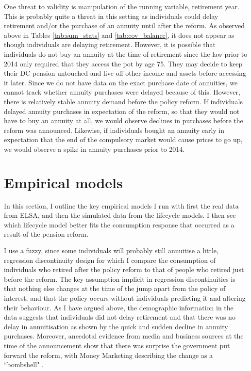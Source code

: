 \documentclass[12pt]{article}
\begin{document}
One threat to validity is manipulation of the running variable, retirement year.
This is probably quite a threat in this setting as individuals could delay
retirement and/or the purchase of an annuity until after the reform. As observed
above in Tables \ref{tab:sum_stats} and \ref{tab:cov_balance}, it does not
appear as though individuals are delaying retirement. However, it is possible
that individuals do not buy an annuity at the time of retirement since the law
prior to 2014 only required that they access the pot by age 75. They may decide
to keep their DC pension untouched and live off other income and assets before
accessing it later. Since we do not have data on the exact purchase date of
annuities, we cannot track whether annuity purchases were delayed because of
this. However, there is relatively stable annuity demand before the policy
reform. If individuals delayed annuity purchases in expectation of the reform,
so that they would not have to buy an annuity at all, we would observe declines
in purchases before the reform was announced. Likewise, if individuals bought an
annuity early in expectation that the end of the compulsory market would cause
prices to go up, we would observe a spike in annuity purchases prior to 2014.


\section{Empirical models}

In this section, I outline the key empirical models I run with first the real
data from ELSA, and then the simulated data from the lifecycle models. I then
see which lifecycle model better fits the consumption response that occurred as
a result of the pension reform.

I use a fuzzy, since some individuals will probably still annuitise a little,
regression discontinuity design for which I compare the consumption of
individuals who retired after the policy reform to that of people who retired
just before the reform. The key assumption implicit in regression
discontinuities is that nothing else changes at the time of the jump apart from
the policy of interest, and that the policy occurs without individuals
predicting it and altering their behaviour. As I have argued above, the
demographic information in the data suggests that individuals did not delay
retirement and that there was no delay in annuitisation as shown by the quick
and sudden decline in annuity purchases. Moreover, anecdotal evidence from media
and business sources at the time of the announcement show that there was
surprise the government put forward the reform, with Money Marketing describing
the change as a ``bombshell" \citep{money_marketing_announcement}.
\end{document}
